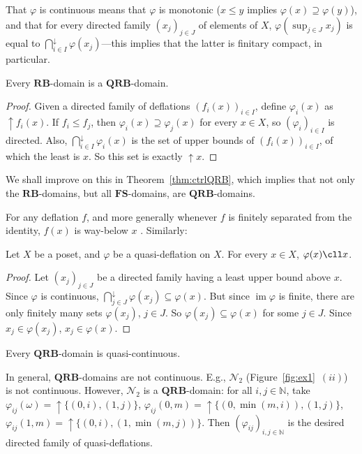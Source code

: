\documentclass{LMCS}
\newcommand\nat{\mathbb{N}}
\newcommand\img{\mathop{\mathrm{im}}}
\newcommand\upc{\mathop{\uparrow}\nolimits}
\newcommand\QRB{\mathbf{QRB}}
\newcommand\RB{\mathbf{RB}}
\newcommand\FS{\mathbf{FS}}
\begin{document}
That $\varphi$ is continuous means that $\varphi$ is monotonic ($x
\leq y$ implies $\varphi (x) \supseteq \varphi (y)$), and that for
every directed family ${(x_j)}_{j \in J}$ of elements of $X$, $\varphi
(\sup_{j \in J} x_j)$ is equal to $\bigcap_{i \in I}^\downarrow
\varphi (x_j)$---this implies that the latter is finitary compact, in
particular.

\begin{prop}
  \label{prop:FS:QRB}
  Every $\RB$-domain is a $\QRB$-domain.
\end{prop}
\begin{proof}
  Given a directed family of deflations ${(f_i (x))}_{i \in I}$,
  define $\varphi_i (x)$ as $\upc f_i (x)$.  If $f_i \leq f_j$, then
  $\varphi_i (x) \supseteq \varphi_j (x)$ for every $x \in X$, so
  ${(\varphi_i)}_{i \in I}$ is directed.  Also, $\bigcap_{i \in
    I}^\downarrow {\varphi_i (x)}$ is the set of upper bounds of
  ${(f_i (x))}_{i \in I}$, of which the least is $x$.  So this set is
  exactly $\upc x$.
\end{proof}
We shall improve on this in Theorem~\ref{thm:ctrlQRB}, which implies
that not only the $\RB$-domains, but all $\FS$-domains, are
$\QRB$-domains.







For any deflation $f$, and more generally whenever $f$ is finitely
separated from the identity, $f (x)$ is way-below $x$
\cite[Lemma~II-2.16]{GHKLMS:contlatt}.  Similarly:
\begin{lem}
  \label{lemma:qdefl:ll}
  Let $X$ be a poset, and $\varphi$ be a quasi-deflation on $X$.  For
  every $x \in X$, $\varphi (x) \cll x$.
\end{lem}
\begin{proof}
  Let ${(x_j)}_{j \in J}$ be a directed family having a least upper
  bound above $x$.  Since $\varphi$ is continuous, $\bigcap_{j \in
    J}^\downarrow {\varphi (x_j)} \subseteq \varphi (x)$.  But since
  $\img \varphi$ is finite, there are only finitely many sets $\varphi
  (x_j)$, $j \in J$.  So ${\varphi (x_j)} \subseteq \varphi (x)$ for
  some $j \in J$.  Since $x_j \in {\varphi (x_j)}$, $x_j \in \varphi
  (x)$.
\end{proof}

\begin{cor}
  \label{corl:qrb:qcont}
  Every $\QRB$-domain is quasi-continuous.
\end{cor}
In general, $\QRB$-domains are not continuous.  E.g., $\mathcal N_2$
(Figure~\ref{fig:ex1}~$(ii)$) is not continuous.  However, $\mathcal
N_2$ is a $\QRB$-domain: for all $i,j \in \nat$, take $\varphi_{ij}
(\omega) = \upc \{(0, i), (1, j)\}$, $\varphi_{ij} (0,m) = \upc \{(0,
\min (m,i)), (1, j)\}$, $\varphi_{ij} (1,m) = \upc \{(0,i), (1, \min
(m,j))\}$.  Then
${(\varphi_{ij})}_{i, j \in \nat}$ is the desired directed family of
quasi-deflations.
\end{document}

